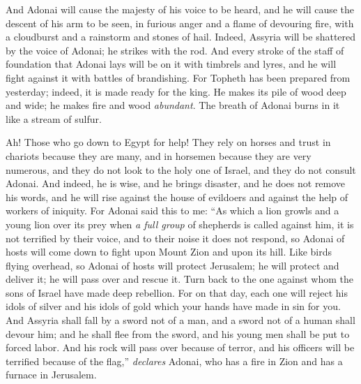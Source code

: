 \begin{biblechapter}
\verse And Adonai will cause the majesty of his voice to be heard, 
and he will cause the descent of his arm to be seen, 
in furious anger and a flame of devouring fire, 
with a cloudburst and a rainstorm and stones of hail.
\verse Indeed, Assyria will be shattered by the voice of Adonai; 
he strikes with the rod.
\verse And every stroke of the staff of foundation that Adonai lays will be on it with timbrels and lyres, 
and he will fight against it with battles of brandishing.
\verse For Topheth has been prepared from yesterday; 
indeed, it is made ready for the king. 
He makes its pile of wood deep and wide; 
he makes fire and wood \textit{abundant}. 
The breath of Adonai burns in it like a stream of sulfur.
\end{biblechapter}

\begin{biblechapter} %
 Ah! Those who go down to Egypt for help! They rely on horses
\verse and trust in chariots because they are many, 
and in horsemen because they are very numerous, 
and they do not look to the holy one of Israel, 
and they do not consult Adonai.
\verse And indeed, he is wise, and he brings disaster, 
and he does not remove his words, 
and he will rise against the house of evildoers 
and against the help of workers of iniquity.
\verse For Adonai said this to me: “As which a lion growls 
and a young lion over its prey when \textit{a full group} of shepherds is called against him, it is not terrified by their voice, 
and to their noise it does not respond, 
so Adonai of hosts will come down to fight upon Mount Zion 
and upon its hill.
\verse Like birds flying overhead, so Adonai of hosts will protect Jerusalem; he will protect and deliver it; 
he will pass over and rescue it.
\verse Turn back to the one against whom the sons of Israel have made deep rebellion.
\verse For on that day, each one will reject his idols of silver 
and his idols of gold which your hands have made in sin for you.
\verse And Assyria shall fall by a sword not of a man, 
and a sword not of a human shall devour him; 
and he shall flee from the sword, 
and his young men shall be put to forced labor.
\verse And his rock will pass over because of terror, 
and his officers will be terrified because of the flag,” 
\textit{declares} Adonai, 
who has a fire in Zion 
and has a furnace in Jerusalem.
\end{biblechapter}


